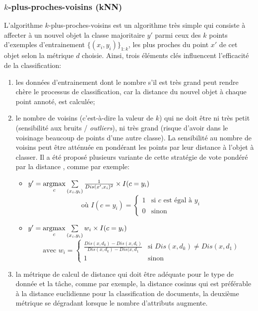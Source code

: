 \subsubsection{$k$-plus-proches-voisins (kNN)}
L'algorithme $k$-plus-proches-voisins est un algorithme très simple qui consiste à affecter à un nouvel objet la classe majoritaire $y'$ parmi ceux des $k$ points d'exemples d'entrainement $\lbrace (x_i,y_i) \rbrace_{1:k}$, les plus proches du point $x'$ de cet objet selon la métrique $d$ choisie. Ainsi, trois éléments clés influencent l'efficacité de la classification:
\begin{enumerate}
	\item les données d'entrainement dont le nombre s'il est très grand peut rendre chère le processus de classification, car la distance du nouvel objet à chaque point annoté, est calculée;
	\item le nombre de voisins (c'est-à-dire la valeur de $k$) qui ne doit être ni très petit (sensibilité aux bruits / \textit{outliers}), ni très grand (risque d'avoir dans le voisinage beaucoup de points d'une autre classe). La sensibilité au nombre de voisins peut être atténuée en pondérant les points par leur distance à l'objet à classer. Il a été proposé plusieurs variante de cette stratégie de \og vote pondéré par la distance \fg{}, comme par exemple:
	\begin{itemize}
		\item $y' = \mathop{\mathrm{argmax}}\limits\limits_c \sum\limits_{(x_i,y_i)} \frac{1}{Dis(x', x_i)^2} \times I(c = y_i)$  \citep{dudani1976originalwknn} \[\text{ où } I(c=y_i) = \left\lbrace \begin{array}{ll}
		1 & \text{si }c \text{ est égal à } y_i \\
		0 & \text{sinon}
		\end{array} \right.\]
		\item $y' = \mathop{\mathrm{argmax}}\limits\limits_c \sum\limits_{(x_i,y_i)} w_i \times I(c = y_i)$ \citep{gou2011wknn} \[\text{ avec } w_i = \left\lbrace \begin{array}{ll}
		\frac{Dis(x, d_k) - Dis(x, d_i)}{Dis(x, d_k) - Dis(x, d_1} & \text{si } Dis(x, d_k) \neq Dis(x, d_1) \\
		1 & \text{sinon}
		\end{array} \right.\]
	\end{itemize}
	 
	\item la métrique de calcul de distance qui doit être adéquate pour le type de donnée et la tâche, comme par exemple, la distance cosinus qui est préférable à la distance euclidienne pour la classification de documents, la deuxième métrique se dégradant lorsque le nombre d'attributs augmente.
\end{enumerate}

